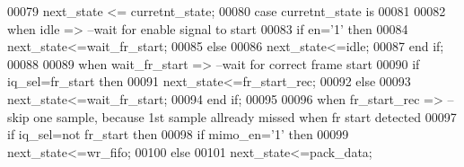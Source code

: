 \begin{DoxyCode}
00079     \textcolor{vhdlchar}{next_state} \textcolor{vhdlchar}{<=} \textcolor{vhdlchar}{curretnt_state};
00080     \textcolor{keywordflow}{case} \textcolor{vhdlchar}{curretnt_state} \textcolor{keywordflow}{is}
00081     
00082         \textcolor{keywordflow}{when} \textcolor{vhdlchar}{idle} \textcolor{vhdlchar}{=}\textcolor{vhdlchar}{>}\textcolor{keyword}{                    --wait for enable signal to start}
00083             \textcolor{keywordflow}{if} \textcolor{vhdlchar}{en}\textcolor{vhdlchar}{=}\textcolor{vhdlchar}{'}\textcolor{vhdllogic}{}\textcolor{vhdllogic}{1}\textcolor{vhdlchar}{'} \textcolor{keywordflow}{then} 
00084                 \textcolor{vhdlchar}{next_state}\textcolor{vhdlchar}{<=}\textcolor{vhdlchar}{wait\_fr\_start};
00085             \textcolor{keywordflow}{else} 
00086                 \textcolor{vhdlchar}{next_state}\textcolor{vhdlchar}{<=}\textcolor{vhdlchar}{idle};
00087             \textcolor{keywordflow}{end} \textcolor{keywordflow}{if};
00088             
00089         \textcolor{keywordflow}{when} \textcolor{vhdlchar}{wait\_fr\_start} \textcolor{vhdlchar}{=}\textcolor{vhdlchar}{>}\textcolor{keyword}{       --wait for correct frame start }
00090             \textcolor{keywordflow}{if} \textcolor{vhdlchar}{iq_sel}\textcolor{vhdlchar}{=}\textcolor{vhdlchar}{fr_start} \textcolor{keywordflow}{then} 
00091                 \textcolor{vhdlchar}{next_state}\textcolor{vhdlchar}{<=}\textcolor{vhdlchar}{fr\_start\_rec};
00092             \textcolor{keywordflow}{else} 
00093                 \textcolor{vhdlchar}{next_state}\textcolor{vhdlchar}{<=}\textcolor{vhdlchar}{wait\_fr\_start};
00094             \textcolor{keywordflow}{end} \textcolor{keywordflow}{if};
00095             
00096         \textcolor{keywordflow}{when} \textcolor{vhdlchar}{fr\_start\_rec} \textcolor{vhdlchar}{=}\textcolor{vhdlchar}{>}\textcolor{keyword}{            -- skip one sample, because 1st sample allready missed when fr
       start detected}
00097             \textcolor{keywordflow}{if} \textcolor{vhdlchar}{iq_sel}\textcolor{vhdlchar}{=}\textcolor{keywordflow}{not} \textcolor{vhdlchar}{fr_start} \textcolor{keywordflow}{then} 
00098                 \textcolor{keywordflow}{if} \textcolor{vhdlchar}{mimo_en}\textcolor{vhdlchar}{=}\textcolor{vhdlchar}{'}\textcolor{vhdllogic}{}\textcolor{vhdllogic}{1}\textcolor{vhdlchar}{'} \textcolor{keywordflow}{then}  
00099                   \textcolor{vhdlchar}{next_state}\textcolor{vhdlchar}{<=}\textcolor{vhdlchar}{wr\_fifo};
00100                 \textcolor{keywordflow}{else} 
00101                     \textcolor{vhdlchar}{next_state}\textcolor{vhdlchar}{<=}\textcolor{vhdlchar}{pack\_data};

\end{DoxyCode}
